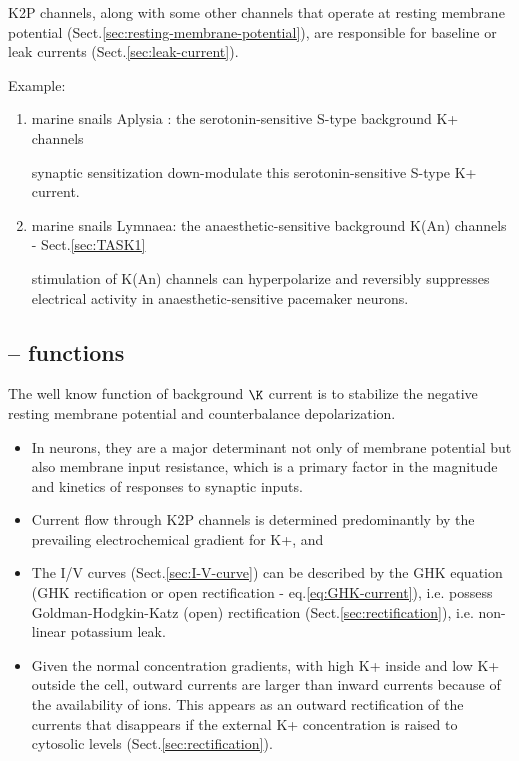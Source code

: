 K2P channels, along with some other channels that operate at resting membrane
potential (Sect.\ref{sec:resting-membrane-potential}), are responsible for
baseline or leak currents (Sect.\ref{sec:leak-current}).

Example:
\begin{enumerate}
  \item marine snails Aplysia : the serotonin-sensitive S-type background K+
  channels
  
  synaptic sensitization down-modulate this serotonin-sensitive S-type K+
  current.
  
  \item marine snails Lymnaea: the anaesthetic-sensitive background K(An)
  channels - Sect.\ref{sec:TASK1}
  
 stimulation of K(An) channels can hyperpolarize and reversibly suppresses
 electrical activity in anaesthetic-sensitive pacemaker neurons.

\end{enumerate}

\subsection{-- functions}

The well know function of background $\K$ current is to stabilize the negative
resting membrane potential and counterbalance depolarization.

\begin{itemize}
  
  \item  In neurons, they are a major determinant not only of membrane potential
  but also membrane input resistance, which is a primary factor in the magnitude
  and kinetics of responses to synaptic inputs.

  \item  Current flow through K2P channels is determined predominantly by the
  prevailing electrochemical gradient for K+, and

  \item The I/V curves (Sect.\ref{sec:I-V-curve}) can be described by the GHK
  equation (GHK rectification or open rectification -
  eq.\ref{eq:GHK-current}), i.e. possess Goldman-Hodgkin-Katz (open)
  rectification (Sect.\ref{sec:rectification}), i.e. non-linear potassium leak.
  
  \item  Given the normal concentration gradients, with high K+ inside and low
  K+ outside the cell, outward currents are larger than inward currents because
  of the availability of ions. This appears as an outward rectification of the
  currents that disappears if the external K+ concentration is raised to
  cytosolic levels (Sect.\ref{sec:rectification}).
\end{itemize}

